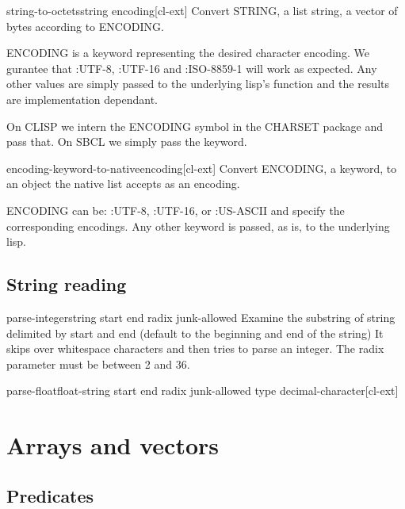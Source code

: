 \documentclass[10pt,english]{book}
\begin{document}
\begin{function}{string-to-octets}{string encoding}[cl-ext]
  Convert STRING, a list string, a vector of bytes according to ENCODING.

ENCODING is a keyword representing the desired character
encoding. We gurantee that :UTF-8, :UTF-16 and :ISO-8859-1 will
work as expected. Any other values are simply passed to the
underlying lisp's function and the results are implementation
dependant.

On CLISP we intern the ENCODING symbol in the CHARSET package and
pass that. On SBCL we simply pass the keyword.
\end{function}

\begin{function}{encoding-keyword-to-native}{encoding}[cl-ext]
  Convert ENCODING, a keyword, to an object the native list
accepts as an encoding.

ENCODING can be: :UTF-8, :UTF-16, or :US-ASCII and specify the
corresponding encodings. Any other keyword is passed, as is, to
the underlying lisp.
\end{function}

\section{String reading}
\label{sec:string-reading}

\begin{function}{parse-integer}{string \key start end radix junk-allowed}
  Examine the substring of string delimited by start and end
  (default to the beginning and end of the string)  It skips over
  whitespace characters and then tries to parse an integer. The
  radix parameter must be between 2 and 36.
\end{function}

\begin{function}{parse-float}{float-string \key start end radix junk-allowed type decimal-character}[cl-ext]
\end{function}




\chapter{Arrays and vectors}
\label{cha:arrays}

\section{Predicates}
\label{sec:array-predicates}
\end{document}
